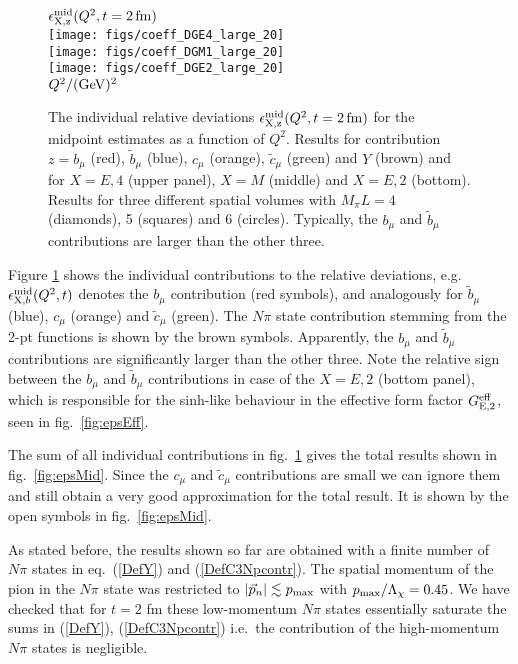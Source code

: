\documentclass[11pt,prd,aps,showpacs,eqsecnum,floatfix,nofootinbib,preprint,tightenlines]{revtex4}
\newcommand{\pref}[1]{(\ref{#1})}
\begin{document}
% 
\begin{figure}[p]
\begin{center}
$\epsilon^{\rm mid}_{\rm X,z}(Q^2,t=2\,{\rm fm})$\\
\texttt{[image: figs/coeff\_DGE4\_large\_20]}\\[2ex]
\texttt{[image: figs/coeff\_DGM1\_large\_20]}\\[2ex]
\texttt{[image: figs/coeff\_DGE2\_large\_20]}\\[1ex]
$Q^2/({\rm GeV})^2$\\[2ex]
\caption{The individual relative deviations $\epsilon^{\rm mid}_{\rm X,z}(Q^2,t=2\,{\rm fm})$ for the midpoint estimates as a function of $Q^2$. Results for contribution $z=b_{\mu}$ (red), $\tilde{b}_{\mu}$ (blue), $c_{\mu}$ (orange), $\tilde{c}_\mu$ (green) and $Y$ (brown) and for $X=E,4$ (upper panel), $X=M$ (middle) and $X=E,2$ (bottom). Results for three different spatial volumes with $M_{\pi}L=4$ (diamonds), 5 (squares) and 6 (circles).
Typically, the $b_{\mu}$ and $\tilde{b}_{\mu}$ contributions are larger than the other three.
}
\label{fig:epsMidcoeff}
\end{center}
\end{figure}

Figure \ref{fig:epsMidcoeff} shows the individual contributions to the relative deviations, e.g.\ $\epsilon^{\rm mid}_{{\rm X},b}(Q^2,t)$ denotes the $b_\mu$ contribution (red symbols), and analogously for $\tilde{b}_\mu$ (blue), $c_\mu$ (orange) and $\tilde{c}_\mu$ (green). The $N\pi$ state contribution stemming from the 2-pt functions is shown by the brown symbols. 
Apparently, the $b_\mu$ and $\tilde{b}_\mu$ contributions are significantly larger than the other three. Note the relative sign between the $b_\mu$ and $\tilde{b}_\mu$ contributions in case of the $X=E,2$ (bottom panel), which is responsible for the sinh-like behaviour in the effective form factor $G^{\rm eff}_{{\rm E},2}$, seen in fig.\ \ref{fig:epsEff}.

The sum of all individual contributions in fig.\ \ref{fig:epsMidcoeff} gives the total results shown in fig.\ \ref{fig:epsMid}. Since the $c_\mu$ and $\tilde{c}_\mu$ contributions are small we can ignore them and still obtain a very good approximation for the total result. It is shown by the open symbols in fig.\ \ref{fig:epsMid}.

As stated before, the results shown so far are obtained with a finite number of $N\pi$ states in eq.\ \pref{DefY} and \pref{DefC3Npcontr}. The spatial momentum of the pion in the $N\pi$ state was restricted to  $|\vec{p}_n|\lesssim p_{\rm max}$ with $p_{\rm max}/\Lambda_{\chi}= 0.45$. We have checked that for $t=2$ fm these low-momentum $N\pi$ states essentially saturate the sums in \pref{DefY}, \pref{DefC3Npcontr} i.e.\ the contribution of the high-momentum $N\pi$ states is negligible. 
\end{document}
